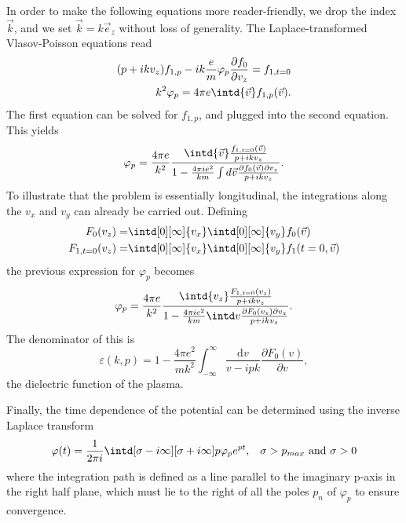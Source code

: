 \documentclass[physics,phd,nolot,nolof]{uccthesis}%
\begin{document}
In order to make the following equations more reader-friendly, we drop the index $\vec k$, and we set $\vec k=k\vec e_z$ without loss of generality.
The Laplace-transformed Vlasov-Poisson equations read
\begin{eqnarray}
	(p+ikv_z)f_{1,p} -ik\frac{e}{m}\varphi_p \frac{\partial f_0}{\partial v_z}=f_{1,t=0}\\
	k^2\varphi_p=4\pi e \intd{\vec v} f_{1,p}(\vec v).
	\label{eq:laplacevlasov}
\end{eqnarray}
The first equation can be solved for $f_{1,p}$, and plugged into the second equation. 
This yields
\begin{equation}
  \varphi_p=\frac{4\pi e}{k^2} \frac{\intd{\vec v} \frac{f_{1,t=0}(\vec v)}{p+ikv_z}}
  {1-\frac{4\pi i e^2}{k m} \int d{\vec v} \frac{\partial f_0(\vec v)\partial v_z}{p+ikv_z}}.
	\label{eq:landau-potential}
\end{equation}
To illustrate that the problem is essentially longitudinal, the integrations along the $v_x$ and $v_y$ can already be carried out. 
Defining 
\begin{eqnarray}
  F_0(v_z)=	&\intd[0][\infty]{v_x} \intd[0][\infty]{v_y} f_0(\vec v) \\
  F_{1,t=0}(v_z)=	&\intd[0][\infty]{v_x} \intd[0][\infty]{v_y} f_{1}(t=0,\vec v) 
	\label{eq:abbrF}
\end{eqnarray}
the previous expression for $\varphi_p$ becomes
\begin{equation}
  \varphi_p=\frac{4\pi e}{k^2} \frac{\intd{v_z} \frac{F_{1,t=0}(v_z)}{p+ikv_z}}
	{1-\frac{4\pi i e^2}{k m} \intd v \frac{\partial F_0(v_z)\partial v_z}{p+ikv_z}}.
	\label{eq:landau-potential-F}
\end{equation}
The denominator of this is
\begin{equation}
\varepsilon(k,p)=1-\frac{4\pi e^2}{m k^2}
\int_{-\infty}^{\infty}\frac{\mathrm{d} v}{v-ipk}\frac{\partial F_0(v)}{\partial v},
	\label{eq:eps}
\end{equation}
the dielectric function of the plasma. 

Finally, the time dependence of the potential can be determined using the inverse Laplace transform 
\begin{equation}
	\varphi(t)=\frac{1}{2\pi i}\intd[\sigma-i\infty][\sigma+i\infty]p \varphi_p e^{pt}, \;\;\;\sigma>p_{max} \text{ and } \sigma>0
	\label{eq:inverselaplace}
\end{equation}
where the integration path is defined as a line parallel to the imaginary p-axis in the right half plane, which must lie to the right of all the poles $p_n$ of $\varphi_p$ to ensure convergence.
\end{document}
